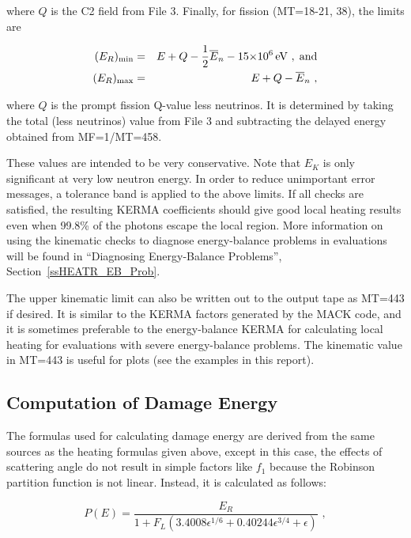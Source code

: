 \noindent
where $Q$ is the C2 field from File 3.  Finally, for fission
(MT=18-21, 38), the limits are

\begin{eqnarray}
   (E_R)_{\rm min}&=&E+Q-\frac{1}{2}
    \overline{E}_n-15{\times}10^6\,\hbox{\rm eV}\,\,,\;\hbox{and}\\
   (E_R)_{\rm max}&=&E+Q-\overline{E}_n\,\,,
\end{eqnarray}

\noindent
where $Q$ is the prompt fission Q-value less neutrinos.  It
is determined by taking the total (less neutrinos) value from
File 3 and subtracting the delayed energy obtained from
MF=1/MT=458.

These values are intended to be very conservative.  Note
that $E_K$ is only significant at very low neutron energy.
In order to reduce unimportant error messages, a tolerance
band is applied to the above limits.  If all checks are
satisfied, the resulting KERMA coefficients should give good
local heating results even when 99.8\% of the photons
escape the local region.  More information on using the
kinematic checks to diagnose energy-balance problems in
evaluations will be found in ``Diagnosing Energy-Balance
Problems'', Section~\ref{ssHEATR_EB_Prob}.

The upper kinematic limit can also be written out to the
output tape as MT=443 if desired.  It is similar to the KERMA
factors generated by the MACK code\cite{MACK}, and it is
sometimes preferable to the energy-balance KERMA for
calculating local heating for evaluations with severe
energy-balance problems.  The kinematic value in MT=443
is useful for plots (see the examples in this report).

\subsection{Computation of Damage Energy}
\label{ssHEATR_damagecomputation}

The formulas used for calculating damage energy are derived
from the same sources as the heating formulas given above,
except in this case, the effects of scattering angle do not
result in simple factors like $f_1$ because the Robinson
partition function is not linear.  Instead, it is
calculated as follows:

\begin{equation}
   P(E)=\frac{E_R}{1+F_L(3.4008\epsilon^{1/6}+0.40244\epsilon^{3/4}
     +\epsilon)}\,\,,
\label{robinson}
\end{equation}
\vspace{0.5 pt}

